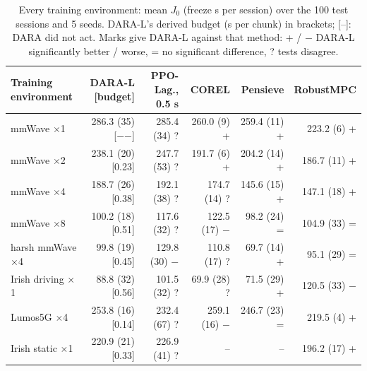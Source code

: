 \begin{table}[t]\centering\footnotesize
\caption{Every training environment: mean $J_0$ (freeze s per session) over the 100 test sessions and 5 seeds. DARA-L's derived budget (s per chunk) in brackets; [--]: DARA did not act. Marks give DARA-L against that method: + / $-$ DARA-L significantly better / worse, = no significant difference, ? tests disagree.}
\label{tab:environments}
\begin{tabular}{lrrrrr}\toprule
Training environment & DARA-L [budget] & PPO-Lag., 0.5 s & COREL & Pensieve & RobustMPC \\\midrule
mmWave $\times$1 & 286.3 (35) [$-$$-$] & 285.4 (34) ? & 260.0 (9) + & 259.4 (11) + & 223.2 (6) + \\
mmWave $\times$2 & 238.1 (20) [0.23] & 247.7 (53) ? & 191.7 (6) + & 204.2 (14) + & 186.7 (11) + \\
mmWave $\times$4 & 188.7 (26) [0.38] & 192.1 (38) ? & 174.7 (14) ? & 145.6 (15) + & 147.1 (18) + \\
mmWave $\times$8 & 100.2 (18) [0.51] & 117.6 (32) ? & 122.5 (17) $-$ & 98.2 (24) = & 104.9 (33) = \\
harsh mmWave $\times$4 & 99.8 (19) [0.45] & 129.8 (30) $-$ & 110.8 (17) ? & 69.7 (14) + & 95.1 (29) = \\
Irish driving $\times$1 & 88.8 (32) [0.56] & 101.5 (32) ? & 69.9 (28) ? & 71.5 (29) + & 120.5 (33) $-$ \\
Lumos5G $\times$4 & 253.8 (16) [0.14] & 232.4 (67) ? & 259.1 (16) $-$ & 246.7 (23) = & 219.5 (4) + \\
Irish static $\times$1 & 220.9 (21) [0.33] & 226.9 (41) ? & -- & -- & 196.2 (17) + \\
\bottomrule\end{tabular}
\end{table}

